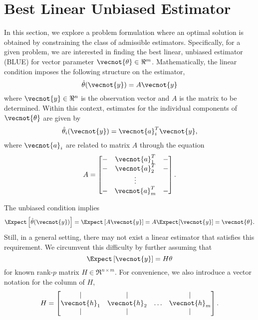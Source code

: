 \section{Best Linear Unbiased Estimator}

In this section, we explore a problem formulation where an optimal solution is obtained by constraining the class of admissible estimators.
Specifically, for a given problem, we are interested in finding the best linear, unbiased estimator (BLUE) for vector parameter $\vecnot{\theta} \in \Re^m$.
Mathematically, the linear condition imposes the following structure on the estimator,
\begin{equation*}
\hat{\theta} (\vecnot{y}) = A \vecnot{y}
\end{equation*}
where $\vecnot{y} \in \Re^n$ is the observation vector and $A$ is the matrix to be determined.
Within this context, estimates for the individual components of $\vecnot{\theta}$ are given by
\begin{equation*}
\hat{\theta}_i (\vecnot{y}) = \vecnot{a}_i^T \vecnot{y} ,
\end{equation*}
where $\vecnot{a}_i$ are related to matrix $A$ through the equation
\begin{equation*}
A = \begin{bmatrix}
- & \vecnot{a}_1^T & - \\
- & \vecnot{a}_2^T & - \\
& \vdots & \\
- & \vecnot{a}_m^T & - \\
\end{bmatrix} .
\end{equation*}

The unbiased condition implies
\begin{equation*}
\Expect \left[ \hat{\theta} (\vecnot{y}) \right]
= \Expect \left[ A \vecnot{y} \right]
= A \Expect [ \vecnot{y} ] = \vecnot{\theta} .
\end{equation*}
Still, in a general setting, there may not exist a linear estimator that satisfies this requirement.
We circumvent this difficulty by further assuming that
\begin{equation*}
\Expect \left[ \vecnot{y} \right] = H \theta
\end{equation*}
for known rank-$p$ matrix $H \in \Re^{n \times m}$.
For convenience, we also introduce a vector notation for the column of $H$,
\begin{equation*}
H = \begin{bmatrix} | & | & & | \\
\vecnot{h}_1 & \vecnot{h}_2 & \hdots & \vecnot{h}_m  \\
| & | & & | \end{bmatrix} .
\end{equation*}

